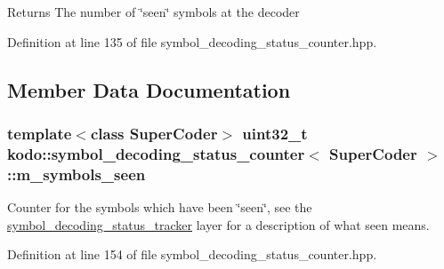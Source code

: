 \begin{DoxyReturn}{Returns}
The number of \char`\"{}seen\char`\"{} symbols at the decoder 
\end{DoxyReturn}


Definition at line 135 of file symbol\-\_\-decoding\-\_\-status\-\_\-counter.\-hpp.



\subsection{Member Data Documentation}
\hypertarget{classkodo_1_1symbol__decoding__status__counter_a3d13d01ddf0cc30601c32c0546057572}{
\subsubsection[{m\-\_\-symbols\-\_\-seen}]{\setlength{\rightskip}{0pt plus 5cm}template$<$class Super\-Coder$>$ uint32\-\_\-t {\bf kodo\-::symbol\-\_\-decoding\-\_\-status\-\_\-counter}$<$ Super\-Coder $>$\-::m\-\_\-symbols\-\_\-seen}}\label{classkodo_1_1symbol__decoding__status__counter_a3d13d01ddf0cc30601c32c0546057572}
Counter for the symbols which have been \char`\"{}seen\char`\"{}, see the \hyperlink{classkodo_1_1symbol__decoding__status__tracker}{symbol\-\_\-decoding\-\_\-status\-\_\-tracker} layer for a description of what seen means. 

Definition at line 154 of file symbol\-\_\-decoding\-\_\-status\-\_\-counter.\-hpp.



